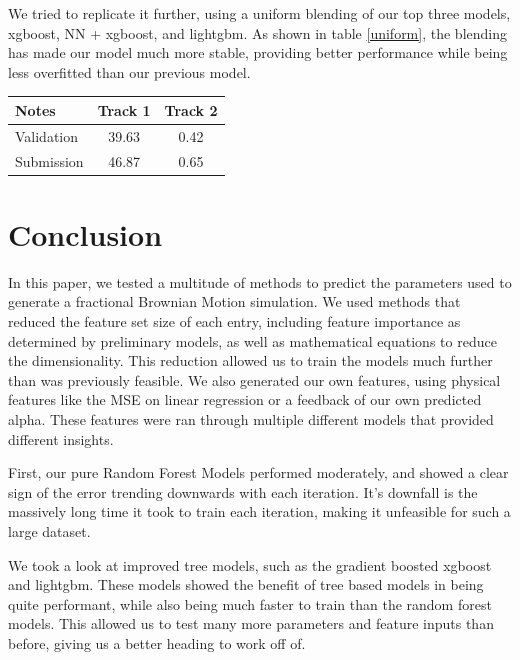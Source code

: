 \documentclass[a4paper, 12pt]{article}
\begin{document}
\begin{multicols}{2}
                We tried to replicate it further, using a uniform blending of our top three models, xgboost, NN + xgboost, and lightgbm. As shown in table \ref {uniform}, the blending has made our model much more stable, providing better performance while being less overfitted than our previous model.
                \begin{center}
                    \begin{tabular}{l|cc}
                        Notes & Track 1 & Track 2 \\
                        \hline
                        Validation & 39.63 & 0.42 \\
                        Submission & 46.87 & 0.65
                    \end{tabular}
                    \label{uniform}
                \end{center}
            \end{multicols}
        \section{Conclusion}
                In this paper, we tested a multitude of methods to predict the parameters used to generate a fractional Brownian Motion simulation. We used methods that reduced the feature set size of each entry, including feature importance as determined by preliminary models, as well as mathematical equations to reduce the dimensionality. This reduction allowed us to train the models much further than was previously feasible. We also generated our own features, using physical features like the MSE on linear regression or a feedback of our own predicted alpha. These features were ran through multiple different models that provided different insights.
                
                First, our pure Random Forest Models performed moderately, and showed a clear sign of the error trending downwards with each iteration. It's downfall is the massively long time it took to train each iteration, making it unfeasible for such a large dataset. 
                
                We took a look at improved tree models, such as the gradient boosted xgboost and lightgbm. These models showed the benefit of tree based models in being quite performant, while also being much faster to train than the random forest models. This allowed us to test many more parameters and feature inputs than before, giving us a better heading to work off of.
\end{document}
